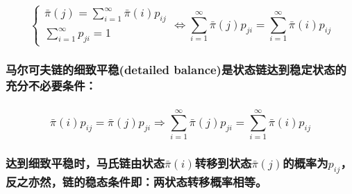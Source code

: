 \documentclass[11pt]{article}
\begin{document}
\subsubsection{\texorpdfstring{\[
\begin{cases}
\bar\pi(j)=\sum_{i=1}^{\infty} \bar\pi(i)p_{ij}\\
\sum_{i=1}^{\infty} p_{ji}=1
\end{cases}
\Leftrightarrow
\sum_{i=1}^{\infty} \bar\pi(j)p_{ji}=\sum_{i=1}^{\infty} \bar\pi(i)p_{ij}\]}{
\textbackslash{}begin\{cases\}
\textbackslash{}bar\textbackslash{}pi(j)=\textbackslash{}sum\_\{i=1\}\^{}\{\textbackslash{}infty\} \textbackslash{}bar\textbackslash{}pi(i)p\_\{ij\}\textbackslash{}\textbackslash{}
\textbackslash{}sum\_\{i=1\}\^{}\{\textbackslash{}infty\} p\_\{ji\}=1
\textbackslash{}end\{cases\}
\textbackslash{}Leftrightarrow
\textbackslash{}sum\_\{i=1\}\^{}\{\textbackslash{}infty\} \textbackslash{}bar\textbackslash{}pi(j)p\_\{ji\}=\textbackslash{}sum\_\{i=1\}\^{}\{\textbackslash{}infty\} \textbackslash{}bar\textbackslash{}pi(i)p\_\{ij\}}}\label{begincasesbarpijsum_i1infty-barpiip_ijsum_i1infty-p_ji1endcasesleftrightarrowsum_i1infty-barpijp_jisum_i1infty-barpiip_ij}

\subsubsection{马尔可夫链的细致平稳(detailed
balance)是状态链达到稳定状态的充分不必要条件：}\label{ux9a6cux5c14ux53efux592bux94feux7684ux7ec6ux81f4ux5e73ux7a33detailed-balanceux662fux72b6ux6001ux94feux8fbeux5230ux7a33ux5b9aux72b6ux6001ux7684ux5145ux5206ux4e0dux5fc5ux8981ux6761ux4ef6}

\subsubsection{\texorpdfstring{\[\bar\pi(i)p_{ij}=\bar\pi(j)p_{ji}
\Rightarrow
\sum_{i=1}^{\infty} \bar\pi(j)p_{ji}=\sum_{i=1}^{\infty} \bar\pi(i)p_{ij}
\]}{\textbackslash{}bar\textbackslash{}pi(i)p\_\{ij\}=\textbackslash{}bar\textbackslash{}pi(j)p\_\{ji\}
\textbackslash{}Rightarrow
\textbackslash{}sum\_\{i=1\}\^{}\{\textbackslash{}infty\} \textbackslash{}bar\textbackslash{}pi(j)p\_\{ji\}=\textbackslash{}sum\_\{i=1\}\^{}\{\textbackslash{}infty\} \textbackslash{}bar\textbackslash{}pi(i)p\_\{ij\}
}}\label{barpiip_ijbarpijp_jirightarrowsum_i1infty-barpijp_jisum_i1infty-barpiip_ij}

\subsubsection{\texorpdfstring{达到细致平稳时，马氏链由状态\(\bar\pi(i)\)转移到状态\(\bar\pi(j)\)的概率为\(p_{ij}\)，反之亦然，链的稳态条件即：两状态转移概率相等。}{达到细致平稳时，马氏链由状态\textbackslash{}bar\textbackslash{}pi(i)转移到状态\textbackslash{}bar\textbackslash{}pi(j)的概率为p\_\{ij\}，反之亦然，链的稳态条件即：两状态转移概率相等。}}\label{ux8fbeux5230ux7ec6ux81f4ux5e73ux7a33ux65f6ux9a6cux6c0fux94feux7531ux72b6ux6001barpiiux8f6cux79fbux5230ux72b6ux6001barpijux7684ux6982ux7387ux4e3ap_ijux53cdux4e4bux4ea6ux7136ux94feux7684ux7a33ux6001ux6761ux4ef6ux5373ux4e24ux72b6ux6001ux8f6cux79fbux6982ux7387ux76f8ux7b49}


    
    
    
    
\end{document}
